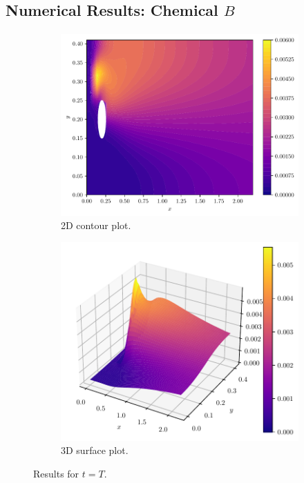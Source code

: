 \documentclass{beamer}
\theoremstyle{definition}
\theoremstyle{remark}
\theoremstyle{example}
\newif\ifinsection
\newif\ifinsubsection
\let\oldsubsection\subsection
\renewcommand{\subsection}{
  \global\insubsectiontrue
  \oldsubsection}
\newcommand {\aframe}[1] {
  \begin{frame}
    \ifinsection\frametitle{\secname}\fi
    \ifinsubsection\framesubtitle{\subsecname}\fi
  #1
  \end{frame}
}
\begin{document}
\subsection{Numerical Results: Chemical $B$}
\aframe{
\begin{figure}
  \begin{subfigure}[b]{0.45\textwidth}
    \centering
    \includegraphics[width=\textwidth]{figs/b-chemical-2d.pdf}
    \caption{2D contour plot.}
  \end{subfigure}
  \begin{subfigure}[b]{0.53\textwidth}
    \centering
    \includegraphics[width=\textwidth]{figs/b-chemical-3d.pdf}
    \caption{3D surface plot.}
  \end{subfigure}
  \caption{Results for $t=T$.}
\end{figure}
}
\end{document}
